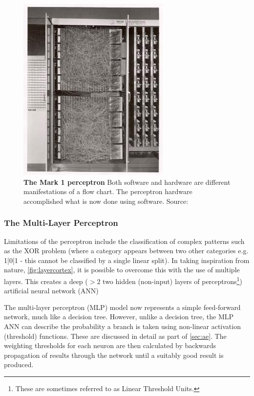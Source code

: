 \begin{figure}[H]
     \centering
         \includegraphics[width=.45\textwidth]{figures_c3/mlpregressor/Mark_I_perceptron.jpg}
        \caption{\textbf{The Mark 1 perceptron} Both software and hardware are different manifestations of a flow chart. The perceptron hardware accomplished what is now done using software. Source: \cite{perceptronimage}}
        \label{fig:perceptron}
\end{figure}

\subsubsection{The Multi-Layer Perceptron}\label{sec:perceptron}
Limitations of the perceptron include the classification of complex patterns such as the XOR problem (where a category appears between two other categories e.g. {1|0|1} - this cannot be classified by a single linear split). In taking inspiration from nature, \autoref{fig:layercortex}, it is possible to overcome this with the use of multiple layers. This creates a deep ($>2$ two hidden (non-input) layers of perceptrons\footnote{These are sometimes referred to as Linear Threshold Units.}) artificial neural network (ANN) 

The multi-layer perceptron (MLP) model now represents a simple feed-forward network, much like a decision tree. However, unlike a decision tree, the MLP ANN can describe the probability a branch is taken using non-linear activation (threshold) functions. These are discussed in detail as part of \autoref{sec:ae}. The weighting thresholds for each neuron are then calculated by backwards propagation of results through the network until a suitably good result is produced. 

